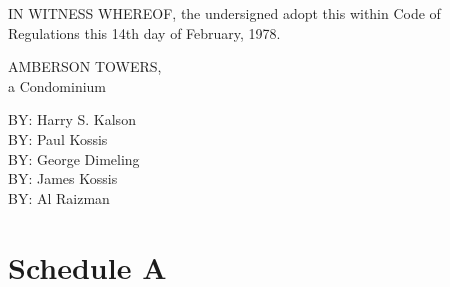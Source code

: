 \documentclass[
]{book}
\begin{document}
IN WITNESS WHEREOF, the undersigned adopt this within Code of Regulations this 14th day of February, 1978.

AMBERSON TOWERS,\\
a Condominium

BY: Harry S. Kalson\\
BY: Paul Kossis\\
BY: George Dimeling\\
BY: James Kossis\\
BY: Al Raizman

\hypertarget{schedule-a}{%
\section*{Schedule A}\label{schedule-a}}
\end{document}
